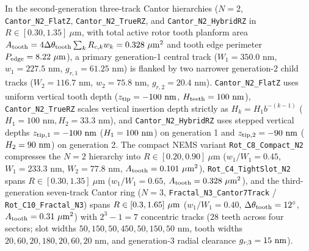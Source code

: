 \documentclass[pdflatex,sn-nature]{sn-jnl}
\DeclareRobustCommand{\roundtwo}[1]{\fpeval{round(#1,2)}}
\DeclareRobustCommand{\roundthree}[1]{\fpeval{round(#1,3)}}
\begin{document}
In the second-generation three-track Cantor hierarchies ($N=2$, \texttt{Cantor\_N2\_FlatZ}, \texttt{Cantor\_N2\_TrueRZ}, and \texttt{Cantor\_N2\_HybridRZ} in $R \in [0.30, 1.35]\ \mu\text{m}$, with total active rotor tooth planform area $A_{\rm tooth} = 4\Delta\theta_{\rm tooth}\sum_k R_{c,k} w_k = \roundthree{\FractalCantorFlatzActiveToothAreaUmtwo}\ \mu\text{m}^2$ and tooth edge perimeter $P_{\rm edge} = \roundtwo{\FractalCantorFlatzEdgePerimeterUm}\ \mu\text{m}$), a primary generation-1 central track ($W_1 = 350.0\text{ nm}$, $w_1 = 227.5\text{ nm}$, $g_{r,1} = 61.25\text{ nm}$) is flanked by two narrower generation-2 child tracks ($W_2 = 116.7\text{ nm}$, $w_2 = 75.8\text{ nm}$, $g_{r,2} = 20.4\text{ nm}$). \texttt{Cantor\_N2\_FlatZ} uses uniform vertical tooth depth ($z_{\rm tip} = -100\text{ nm}$, $H_{\rm teeth} = 100\text{ nm}$), \texttt{Cantor\_N2\_TrueRZ} scales vertical insertion depth strictly as $H_k = H_1 b^{-(k-1)}$ ($H_1 = 100\text{ nm}, H_2 = 33.3\text{ nm}$), and \texttt{Cantor\_N2\_HybridRZ} uses stepped vertical depths $z_{\rm tip,1} = -100{}\text{ nm}$ ($H_1 = 100{}\text{ nm}$) on generation 1 and $z_{\rm tip,2} = -90{}\text{ nm}$ ($H_2 = 90{}\text{ nm}$) on generation 2. The compact NEMS variant \texttt{Rot\_C8\_Compact\_N2} compresses the $N=2$ hierarchy into $R \in [0.20, 0.90]\ \mu\text{m}$ ($w_1/W_1 = 0.45$, $W_1 = 233.3\text{ nm}$, $W_2 = 77.8\text{ nm}$, $A_{\rm tooth} = \roundthree{\RotCeightCompactNtwoStandardThetaZerofoureightpzeroPolarOverlapUmtwo}\ \mu\text{m}^2$), \texttt{Rot\_C4\_TightSlot\_N2} spans $R \in [0.30, 1.35]\ \mu\text{m}$ ($w_1/W_1 = 0.65$, $A_{\rm tooth} = \roundthree{\RotCfourTightslotNtwoHighThetaZerofoureightpzeroPolarOverlapUmtwo}\ \mu\text{m}^2$), and the third-generation seven-track Cantor ring ($N=3$, \texttt{Fractal\_N3\_Cantor7Track} / \texttt{Rot\_C10\_Fractal\_N3}) spans $R \in [0.3{}, 1.65{}]\ \mu\text{m}$ ($w_1/W_1 = 0.40$, $\Delta\theta_{\rm tooth} = 12^\circ$, $A_{\rm tooth} = \roundthree{\RotConezeroFractalNthreeStandardThetaZerofoureightpzeroPolarOverlapUmtwo}\ \mu\text{m}^2$) with $2^3 - 1 = 7$ concentric tracks ($28$ teeth across four sectors; slot widths $50, 150, 50, 450, 50, 150, 50\text{ nm}$, tooth widths $20, 60, 20, 180, 20, 60, 20\text{ nm}$, and generation-3 radial clearance $g_{r,3} = 15{}\text{ nm}$).
\end{document}
